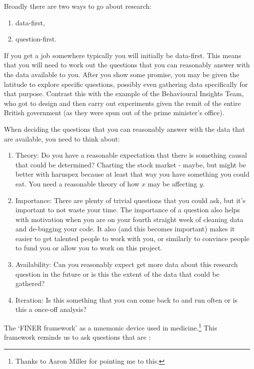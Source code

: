 \documentclass[
]{book}
\providecommand{\tightlist}{%
  \setlength{\itemsep}{0pt}\setlength{\parskip}{0pt}}
\begin{document}
Broadly there are two ways to go about research:

\begin{enumerate}
\def\labelenumi{\arabic{enumi})}
\tightlist
\item
  data-first,
\item
  question-first.
\end{enumerate}

If you get a job somewhere typically you will initially be data-first. This means that you will need to work out the questions that you can reasonably answer with the data available to you. After you show some promise, you may be given the latitude to explore specific questions, possibly even gathering data specifically for that purpose. Contrast this with the example of the Behavioural Insights Team, \citep[p.~23]{gertler2016impact} who got to design and then carry out experiments given the remit of the entire British government (as they were spun out of the prime minister's office).

When deciding the questions that you can reasonably answer with the data that are available, you need to think about:

\begin{enumerate}
\def\labelenumi{\arabic{enumi})}
\tightlist
\item
  Theory: Do you have a reasonable expectation that there is something causal that could be determined? Charting the stock market - maybe, but might be better with haruspex because at least that way you have something you could eat. You need a reasonable theory of how \(x\) may be affecting \(y\).
\item
  Importance: There are plenty of trivial questions that you could ask, but it's important to not waste your time. The importance of a question also helps with motivation when you are on your fourth straight week of cleaning data and de-bugging your code. It also (and this becomes important) makes it easier to get talented people to work with you, or similarly to convince people to fund you or allow you to work on this project.
\item
  Availability: Can you reasonably expect get more data about this research question in the future or is this the extent of the data that could be gathered?
\item
  Iteration: Is this something that you can come back to and run often or is this a once-off analysis?
\end{enumerate}

The `FINER framework' as a mnemonic device used in medicine.\footnote{Thanks to Aaron Miller for pointing me to this.} This framework reminds us to ask questions that are \citep{hulley2007designing}:
\end{document}
